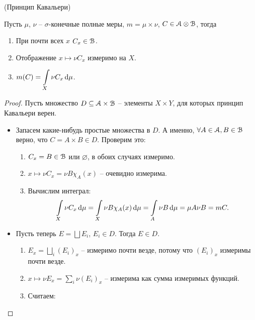 \begin{theorem}(Принцип Кавальери)

    Пусть $\mu$, $\nu$ -- $\sigma$-конечные полные меры, $m = \mu \times \nu$, $C \in \mathcal{A} \otimes \mathcal{B}$,
    тогда
    \begin{enumerate}
        \item При почти всех $x$ $C_x \in \mathcal{B}$.
        \item Отображение $x \mapsto \nu{C_x}$ измеримо на $X$.
        \item $\displaystyle m(C) = \int\limits_{X}{\nu{C_x} \,\mathrm{d}\mu}$.
    \end{enumerate} 
\end{theorem}
\begin{proof}
    Пусть множество $D \subseteq \mathcal{A} \times \mathcal{B}$ -- элементы $X \times Y$, для которых 
    принцип Кавальери верен.
    \begin{itemize}
        \item Запасем какие-нибудь простые множества в $D$. А именно, $\forall A \in \mathcal{A}, B \in \mathcal{B}$
            верно, что $C = A \times B \in D$. Проверим это:
            \begin{enumerate}
                \item $C_x = B \in \mathcal{B}$ или $\varnothing$, в обоих случаях измеримо.
                \item $x \mapsto \nu{C_x} = \nu{B} \chi_A(x)$ -- очевидно измерима.
                \item Вычислим интеграл:
                    \[
                        \int\limits_X{\nu{C_x} \,\mathrm{d}\mu} = \int\limits_X{\nu{B} \chi_A(x) \,\mathrm{d}\mu} = 
                        \int\limits_A{\nu{B} \,\mathrm{d}\mu} = \mu{A} \nu{B} = m{C}
                    .\]
            \end{enumerate}
        \item Пусть теперь $E = \bigsqcup{E_i}$, $E_i \in D$. Тогда $E \in D$.
            \begin{enumerate}
                \item $E_x = \bigsqcup_i{(E_i)_x}$ -- измеримо почти везде, потому что
                    $(E_i)_x$ измеримы почти везде.
                \item $x \mapsto \nu{E_x} = \sum_i{\nu{(E_i)_x}}$ -- измерима как сумма
                    измеримых функций.
                \item Считаем:

\end{enumerate}
\end{itemize}
\end{proof}
